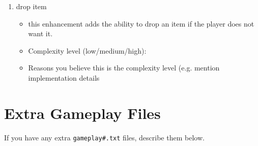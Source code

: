 \documentclass[11pt]{article}
\begin{document}
\begin{enumerate}
\item drop item
	\begin{itemize}
	\item this enhancement adds the ability to drop an item if the player does not want it.
	\item Complexity level (low/medium/high):
	\item Reasons you believe this is the complexity level (e.g. mention implementation details
	\end{itemize}


\end{enumerate}


\section*{Extra Gameplay Files}

If you have any extra \texttt{gameplay\#.txt} files, describe them below.
\end{document}
